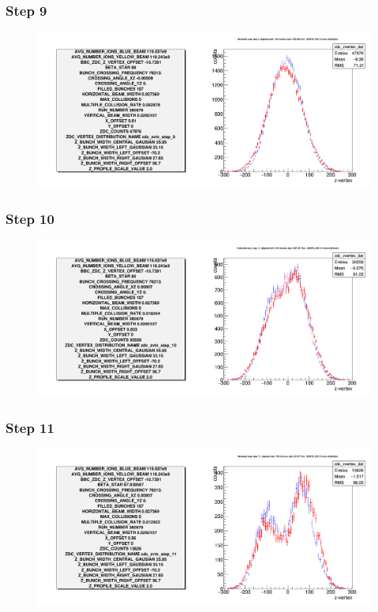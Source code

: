\begin{frame}
  \frametitle{Step 9}
  \begin{figure}
    \includegraphics[width=\linewidth]{"./figures/tuned_simulation_step_9"}
    \caption{}
    \label{fig:step_9}
  \end{figure}
\end{frame}

\begin{frame}
  \frametitle{Step 10}
  \begin{figure}
    \includegraphics[width=\linewidth]{"./figures/tuned_simulation_step_10"}
    \caption{}
    \label{fig:step_10}
  \end{figure}
\end{frame}

\begin{frame}
  \frametitle{Step 11}
  \begin{figure}
    \includegraphics[width=\linewidth]{"./figures/tuned_simulation_step_11"}
    \caption{}
    \label{fig:step_11}
  \end{figure}
\end{frame}

